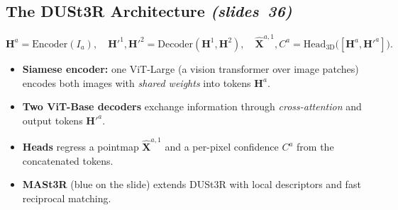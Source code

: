 \documentclass[11pt,a4paper]{article}
\newcommand{\slr}[1]{\texorpdfstring{\emph{(slides~#1)}}{(slides #1)}}
\newcommand{\Xhat}{\hat{\bm{X}}}
\theoremstyle{definition}
\begin{document}
\subsection{The DUSt3R Architecture \slr{36}}
\[ \bm H^a=\mathrm{Encoder}(I_a),\quad \bm H'^1,\bm H'^2=\mathrm{Decoder}(\bm H^1,\bm H^2),\quad \Xhat^{a,1},C^a=\mathrm{Head}_{\mathrm{3D}}\bigl([\bm H^a,\bm H'^a]\bigr). \]
\begin{itemize}
\item \textbf{Siamese encoder:} one ViT-Large (a vision transformer over image patches) encodes both images with \emph{shared weights} into tokens $\bm H^a$.
\item \textbf{Two ViT-Base decoders} exchange information through \emph{cross-attention} and output tokens $\bm H'^a$.
\item \textbf{Heads} regress a pointmap $\Xhat^{a,1}$ and a per-pixel confidence $C^a$ from the concatenated tokens.
\item \textbf{MASt3R} (blue on the slide) extends DUSt3R with local descriptors and fast reciprocal matching.
\end{itemize}
\end{document}
